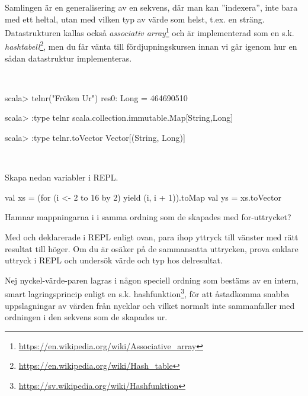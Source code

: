Samlingen  är en generalisering av en sekvens, där man kan ''indexera'', inte bara med ett heltal, utan med vilken typ av värde som helst, t.ex. en sträng. Datastrukturen  kallas också \emph{associativ array}\footnote{\href{https://en.wikipedia.org/wiki/Associative_array}{https://en.wikipedia.org/wiki/Associative\_array}} och är implementerad som en s.k. \emph{hashtabell}\footnote{\href{https://en.wikipedia.org/wiki/Hash_table}{https://en.wikipedia.org/wiki/Hash\_table}}, men du får vänta till fördjupningskursen innan vi går igenom hur en sådan datastruktur implementeras.

\SOLUTION

\TaskSolved \what~

\begin{REPL}
scala> telnr("Fröken Ur")
res0: Long = 464690510

scala> :type telnr
scala.collection.immutable.Map[String,Long]

scala> :type telnr.toVector
Vector[(String, Long)]
\end{REPL}

\QUESTEND




\QUESTBEGIN

\Task \what~

\Subtask Skapa nedan variabler i REPL.
\begin{Code}
val xs = (for (i <- 2 to 16 by 2) yield (i, i + 1)).toMap
val ys = xs.toVector
\end{Code}
Hamnar mappningarna i  i samma ordning som de skapades med for-uttrycket?

\Subtask Med  och  deklarerade i REPL enligt ovan, para ihop yttryck till vänster med rätt resultat till höger. Om du är osäker på de sammansatta uttrycken, prova enklare uttryck i REPL och undersök värde och typ hos delresultat.

\begin{ConceptConnections}

\end{ConceptConnections}

\SOLUTION

\TaskSolved \what


\SubtaskSolved Nej nyckel-värde-paren lagras i någon speciell ordning som bestäms av en intern, smart lagringsprincip enligt en s.k. hashfunktion\footnote{\url{https://sv.wikipedia.org/wiki/Hashfunktion}}, för att åstadkomma snabba uppslagningar av värden från nycklar och vilket normalt inte sammanfaller med ordningen i den sekvens som de skapades ur.

